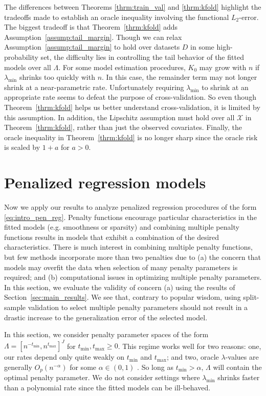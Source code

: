 \documentclass[12pt]{article} %
\theoremstyle{definition}
\begin{document}
The differences between Theorems \ref{thrm:train_val} and \ref{thrm:kfold} highlight the tradeoffs made to establish an oracle inequality involving the functional $L_2$-error.
The biggest tradeoff is that Theorem~\ref{thrm:kfold} adds Assumption~\ref{assump:tail_margin}.
Though we can relax Assumption~\ref{assump:tail_margin} to hold over datasets $D$ in some high-probability set, the difficulty lies in controlling the tail behavior of the fitted models over all $\Lambda$.
For some model estimation procedures, $K_0$ may grow with $n$ if $\lambda_{\min}$ shrinks too quickly with $n$.
In this case, the remainder term may not longer shrink at a near-parametric rate.
Unfortunately requiring $\lambda_{\min}$ to shrink at an appropriate rate seems to defeat the purpose of cross-validation.
So even though Theorem~\ref{thrm:kfold} helps us better understand cross-validation, it is limited by this assumption.
In addition, the Lipschitz assumption must hold over all $\mathcal{X}$ in Theorem~\ref{thrm:kfold}, rather than just the observed covariates.
Finally, the oracle inequality in Theorem~\ref{thrm:kfold} is no longer sharp since the oracle risk is scaled by $1+a$ for $a > 0$.

\section{Penalized regression models}
\label{sec:examples}
Now we apply our results to analyze penalized regression procedures of the form \eqref{eq:intro_pen_reg}.
Penalty functions encourage particular characteristics in the fitted models (e.g. smoothness or sparsity) and combining multiple penalty functions results in models that exhibit a combination of the desired characteristics. 
There is much interest in combining multiple penalty functions, but few methods incorporate more than two penalties due to (a) the concern that models may overfit the data when selection of many penalty parameters is required; and (b) computational issues in optimizing multiple penalty parameters. In this section, we evaluate the validity of concern (a) using the results of Section~\ref{sec:main_results}. We see that, contrary to popular wisdom, using split-sample validation to select multiple penalty parameters should not result in a drastic increase to the generalization error of the selected model.

In this section, we consider penalty parameter spaces of the form
$\Lambda = [ n^{-t_{\min}}, n^{t_{\max}}]^J$
for $t_{\min}, t_{\max} \ge 0$.
This regime works well for two reasons: one, our rates depend only quite weakly on $t_{\min}$ and $t_{\max}$; and two, oracle $\lambda$-values are generally $O_p(n^{-\alpha})$ for some $\alpha \in (0,1)$ \citep{van2000empirical, van2015penalized, buhlmann2011statistics}. So long as $t_{\min} > \alpha$, $\Lambda$ will contain the optimal penalty parameter.
We do not consider settings where $\lambda_{\min}$ shrinks faster than a polynomial rate since the fitted models can be ill-behaved.
\end{document}
